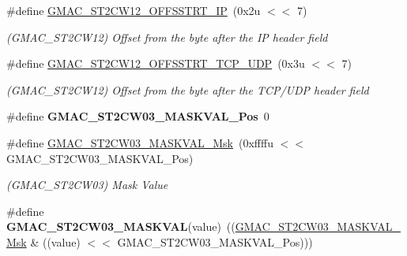 \begin{DoxyCompactItemize}
\mbox{\label{group__SAMV71__GMAC_ga632c60a499153614535a08467c2bc068}} 
\#define \mbox{\hyperlink{group__SAMV71__GMAC_ga632c60a499153614535a08467c2bc068}{G\+M\+A\+C\+\_\+\+S\+T2\+C\+W12\+\_\+\+O\+F\+F\+S\+S\+T\+R\+T\+\_\+\+IP}}~(0x2u $<$$<$ 7)
\begin{DoxyCompactList}\small\item\em (G\+M\+A\+C\+\_\+\+S\+T2\+C\+W12) Offset from the byte after the IP header field \end{DoxyCompactList}\item 
\mbox{\label{group__SAMV71__GMAC_ga5d6d1664ac151e087262ecfbe28f1ba4}} 
\#define \mbox{\hyperlink{group__SAMV71__GMAC_ga5d6d1664ac151e087262ecfbe28f1ba4}{G\+M\+A\+C\+\_\+\+S\+T2\+C\+W12\+\_\+\+O\+F\+F\+S\+S\+T\+R\+T\+\_\+\+T\+C\+P\+\_\+\+U\+DP}}~(0x3u $<$$<$ 7)
\begin{DoxyCompactList}\small\item\em (G\+M\+A\+C\+\_\+\+S\+T2\+C\+W12) Offset from the byte after the T\+C\+P/\+U\+DP header field \end{DoxyCompactList}\item 
\mbox{\label{group__SAMV71__GMAC_ga581ddefe19c4a09338ff122184403206}} 
\#define {\bfseries G\+M\+A\+C\+\_\+\+S\+T2\+C\+W03\+\_\+\+M\+A\+S\+K\+V\+A\+L\+\_\+\+Pos}~0
\item 
\mbox{\label{group__SAMV71__GMAC_ga7228ea6adf3e3cef3fc3d09348dbc7ee}} 
\#define \mbox{\hyperlink{group__SAMV71__GMAC_ga7228ea6adf3e3cef3fc3d09348dbc7ee}{G\+M\+A\+C\+\_\+\+S\+T2\+C\+W03\+\_\+\+M\+A\+S\+K\+V\+A\+L\+\_\+\+Msk}}~(0xffffu $<$$<$ G\+M\+A\+C\+\_\+\+S\+T2\+C\+W03\+\_\+\+M\+A\+S\+K\+V\+A\+L\+\_\+\+Pos)
\begin{DoxyCompactList}\small\item\em (G\+M\+A\+C\+\_\+\+S\+T2\+C\+W03) Mask Value \end{DoxyCompactList}\item 
\mbox{\label{group__SAMV71__GMAC_ga2f42f547c01f225d9b63ad2f709aef90}} 
\#define {\bfseries G\+M\+A\+C\+\_\+\+S\+T2\+C\+W03\+\_\+\+M\+A\+S\+K\+V\+AL}(value)~((\mbox{\hyperlink{group__SAMV71__GMAC_ga7228ea6adf3e3cef3fc3d09348dbc7ee}{G\+M\+A\+C\+\_\+\+S\+T2\+C\+W03\+\_\+\+M\+A\+S\+K\+V\+A\+L\+\_\+\+Msk}} \& ((value) $<$$<$ G\+M\+A\+C\+\_\+\+S\+T2\+C\+W03\+\_\+\+M\+A\+S\+K\+V\+A\+L\+\_\+\+Pos)))

\end{DoxyCompactItemize}
